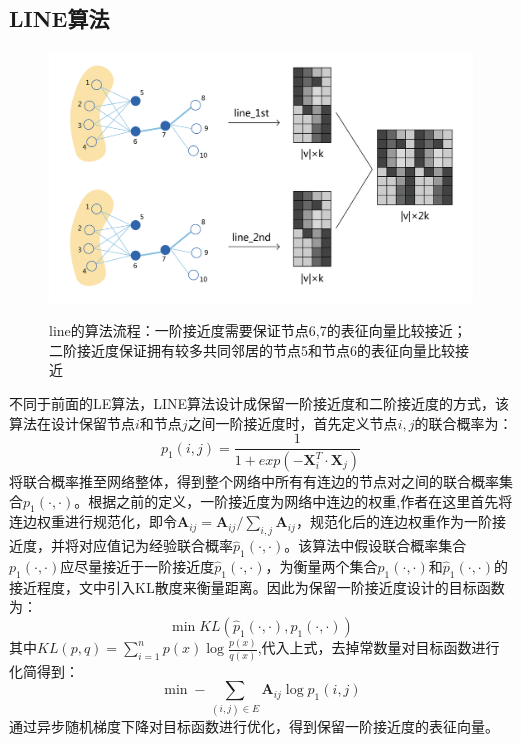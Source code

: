 \subsection{LINE算法}
 \begin{figure}[!ht]
	\centering
	{\includegraphics[width=5in]{figures/line.png}}
	\caption{line的算法流程：一阶接近度需要保证节点6,7的表征向量比较接近；二阶接近度保证拥有较多共同邻居的节点5和节点6的表征向量比较接近}\label{line_process}
\end{figure}
 不同于前面的LE算法，LINE算法设计成保留一阶接近度和二阶接近度的方式，该算法在设计保留节点$i$和节点$j$之间一阶接近度时，首先定义节点$i,j$的联合概率为：
 \begin{equation}
 p_1(i,j) = \frac{1}{1+exp(-\textbf{X}_i^T \cdot \textbf{X}_j)}
 \end{equation}
 将联合概率推至网络整体，得到整个网络中所有有连边的节点对之间的联合概率集合$p_1(\cdot,\cdot)$。根据之前的定义，一阶接近度为网络中连边的权重,作者在这里首先将连边权重进行规范化，即令$\textbf{A}_{ij} =\textbf{A}_{ij}/\sum_{i,j}\textbf{A}_{ij} $，规范化后的连边权重作为一阶接近度，并将对应值记为经验联合概率$\hat{p}_1(\cdot,\cdot)$。该算法中假设联合概率集合$p_1(\cdot,\cdot)$应尽量接近于一阶接近度$\hat{p}_1(\cdot,\cdot)$，为衡量两个集合$p_1(\cdot, \cdot)$和$\hat{p}_1(\cdot,\cdot)$的接近程度，文中引入KL散度来衡量距离。因此为保留一阶接近度设计的目标函数为：
 \begin{equation}
 	\min KL(\hat{p}_1(\cdot, \cdot),p_1(\cdot,\cdot))
 \end{equation}
 其中$KL(p,q) = \sum_{i=1}^{n}p(x)\log\frac{p(x)}{q(x)}$,代入上式，去掉常数量对目标函数进行化简得到：
 \begin{equation}\label{line_1st}
 	\min -\sum_{(i,j) \in E} \textbf{A}_{ij}\log p_1(i,j)
 \end{equation}
 通过异步随机梯度下降对目标函数进行优化，得到保留一阶接近度的表征向量。
 
